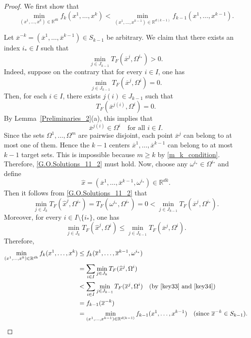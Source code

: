 \documentclass[sn-mathphys-num]{sn-jnl}%
\def\Hat{\widehat}
\theoremstyle{definition}
\begin{document}
\begin{proof}
We first show that
\begin{equation}
\label{G.O.Solutions_11_1}
\min_{(x^1,\dots,x^k)\in\mathbb{R}^{dk}} f_k(x^1,\dots,x^k)
<
\min_{(x^1,\dots,x^{k-1})\in\mathbb{R}^{d(k-1)}} f_{k-1}(x^1,\dots,x^{k-1}).
\end{equation}

Let $\overline{x}^{-k}=(\overline{x}^1,\dots,\overline{x}^{k-1})\in S_{k-1}$ be arbitrary. We claim that there exists an index $i_*\in I$ such that
\begin{equation}
\label{G.O.Solutions_11_2}
\min_{j\in J_{k-1}}T_F(\overline{x}^j,\Omega^{i_*})>0.
\end{equation}
Indeed, suppose on the contrary that for every $i\in I$, one has
\[
\min_{j\in J_{k-1}}T_F(\overline{x}^j,\Omega^i)=0.
\]
Then, for each $i\in I$, there exists $j(i)\in J_{k-1}$ such that
\[
T_F(\overline{x}^{j(i)},\Omega^i)=0.
\]
By Lemma~\ref{Preliminaries_2}(a), this implies that
\[
\overline{x}^{j(i)}\in\Omega^i \quad \text{for all } i\in I.
\]
Since the sets $\Omega^1,\dots,\Omega^m$ are pairwise disjoint, each point $\overline{x}^j$ can belong to at most one of them. Hence the $k-1$ centers $\overline{x}^1,\dots,\overline{x}^{k-1}$ can belong to at most $k-1$ target sets. This is impossible because $m\ge k$ by \eqref{m_k_condition}. Therefore, \eqref{G.O.Solutions_11_2} must hold. Now, choose any $\omega^{i_*}\in\Omega^{i_*}$ and define
\[
\Hat{x}=(\overline{x}^1,\dots,\overline{x}^{k-1},\omega^{i_*})\in\mathbb{R}^{dk}.
\]
Then it follows from \eqref{G.O.Solutions_11_2} that
\begin{equation}\label{key33}
\min_{j\in J_k}T_F(\Hat{x}^j,\Omega^{i_*})=T_F(\omega^{i_*},\Omega^{i_*})=0
<
\min_{j\in J_{k-1}}T_F(\overline{x}^j,\Omega^{i_*}).    
\end{equation}
 Moreover, for every $i\in I\setminus\{i_*\}$, one has
 \begin{equation}\label{key34}
    \min_{j\in J_k}T_F(\Hat{x}^j,\Omega^i)
\le
\min_{j\in J_{k-1}}T_F(\overline{x}^j,\Omega^i).
\end{equation}
Therefore,
\[
\begin{aligned}
\min_{(x^1,\dots,x^k)\in\mathbb{R}^{dk}} f_k(x^1,\dots,x^{k})
&\le f_k(\overline{x}^1,\dots,\overline{x}^{k-1},\omega^{i_*}) \\
&= \sum_{i\in I}\min_{j\in J_k}T_F(\Hat{x}^j,\Omega^i) \\
&< \sum_{i\in I}\min_{j\in J_{k-1}}T_F(\overline{x}^j,\Omega^i)\quad(\text{by \eqref{key33} and \eqref{key34}}) \\
&= f_{k-1}(\overline{x}^{-k}) \\
&= \min_{(x^1,\dots,x^{k-1})\in\mathbb{R}^{d(k-1)}} f_{k-1}(x^1,\dots,x^{k-1}) \quad(\text{since $\overline{x}^{-k}\in S_{k-1}$}).
\end{aligned}
\]


\end{proof}
\end{document}

